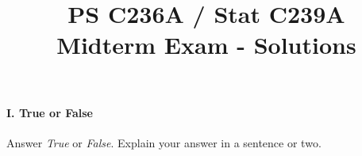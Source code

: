 \documentclass{article}
\title{PS C236A / Stat C239A \\  Midterm Exam  - Solutions}
\date{}
\begin{document}
\maketitle
\vspace{-4em}







\paragraph{\Large I. True or False}
Answer {\em True} or {\em False}.  Explain your answer in a sentence or two.
\end{document}
